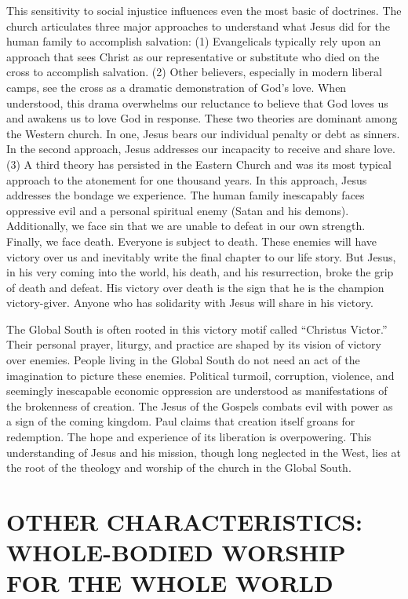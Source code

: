This sensitivity to social injustice influences even the most basic of doctrines. The church
articulates three major approaches to understand what Jesus did for the human family to accomplish
salvation: (1) Evangelicals typically rely upon an approach that sees Christ as our representative
or substitute who died on the cross to accomplish salvation. (2) Other believers, especially in
modern liberal camps, see the cross as a dramatic demonstration of God’s love. When understood, this
drama overwhelms our reluctance to believe that God loves us and awakens us to love God in response.
These two theories are dominant among the Western church. In one, Jesus bears our individual penalty
or debt as sinners. In the second approach, Jesus addresses our incapacity to receive and share
love. (3) A third theory has persisted in the Eastern Church and was its most typical approach to
the atonement for one thousand years. In this approach, Jesus addresses the bondage we experience.
The human family inescapably faces oppressive evil and a personal spiritual enemy (Satan and his
demons). Additionally, we face sin that we are unable to defeat in our own strength. Finally, we
face death. Everyone is subject to death. These enemies will have victory over us and inevitably
write the final chapter to our life story. But Jesus, in his very coming into the world, his death,
and his resurrection, broke the grip of death and defeat. His victory over death is the sign that he
is the champion victory-giver. Anyone who has solidarity with Jesus will share in his victory.

The Global South is often rooted in this victory motif called “Christus Victor.” Their personal
prayer, liturgy, and practice are shaped by its vision of victory over enemies. People living in the
Global South do not need an act of the imagination to picture these enemies. Political turmoil,
corruption, violence, and seemingly inescapable economic oppression are understood as manifestations
of the brokenness of creation. The Jesus of the Gospels combats evil with power as a sign of the
coming kingdom. Paul claims that creation itself groans for redemption. The hope and experience of
its liberation is overpowering. This understanding of Jesus and his mission, though long neglected
in the West, lies at the root of the theology and worship of the church in the Global South.

\section{OTHER CHARACTERISTICS: WHOLE-BODIED WORSHIP FOR THE WHOLE WORLD}

